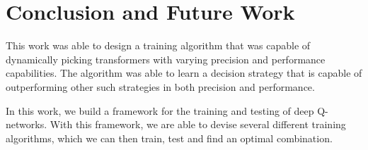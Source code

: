
\chapter{Conclusion and Future Work}

This work was able to design a training algorithm that was capable of dynamically picking transformers with varying precision and performance capabilities. The algorithm was able to learn a decision strategy that is capable of outperforming other such strategies in both precision and performance. 

In this work, we build a framework for the training and testing of deep Q-networks. With this framework, we are able to devise several different training algorithms, which we can then train, test and find an optimal combination. 